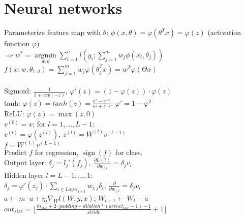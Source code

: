 \section*{Neural networks}
Parameterize feature map with $\theta$: $\phi(x,\theta) = \varphi(\theta^T x) = \varphi(z)$ (activation function $\varphi$)\\
$\Rightarrow w^* = \underset{w, \theta}{\operatorname{argmin}} \sum_{i=1}^n l(y_i; \sum_{j=1}^m w_j \phi(x_i, \theta_j))$\\
$f(x; w, \theta_{1:d}) = \sum_{j=1}^m w_j \varphi(\theta_j^T x) = w^T \varphi(\Theta x)$\\
\\
Sigmoid: $\frac{1}{1+exp(-z)}$,  $\varphi'(z) = (1 - \varphi(z))\cdot\varphi(z)$\\
tanh: $\varphi(z) = tanh(z) = \frac{e^z-e^{-z}}{e^z+e^{-z}}$; $\varphi' = 1 - \varphi ^2$ \\
ReLU:  $\varphi(z) = \max(z,0)$\\
$v^{(0)} = x$; for $l = 1,...,L-1$: \\
$v^{(l)} = \varphi(z^{(l)})$, $z^{(l)} = W^{(l)}v^{(l-1)}$\\
$f = W^{(L)}v^{(L-1)}$\\
Predict $f$ for regression, $\operatorname{sign}(f)$ for class.\\
Output layer: 
$\delta_j = l_j'(f_j)$,
$\frac{\partial L(?)}{\partial w_{j,i}} = \delta_j v_i$\\
Hidden layer $l=L-1,...,1$:\\
$\delta_j = \varphi'(z_j) \cdot \sum_{i\in Layer_{l+1}} w_{i,j}\delta_i$,
$\frac{\partial}{\partial w_{j,i}} = \delta_j v_i$\\
$a \leftarrow m \cdot a + \eta_t \nabla_W l(W;y,x)$; $W_{t+1} \leftarrow W_t - a$\\
 $out_{size} = \lfloor \frac{in_{size} + 2\cdot padding - dilation*(kernel_{size} -1) - 1}{stride}  +1  \rfloor $